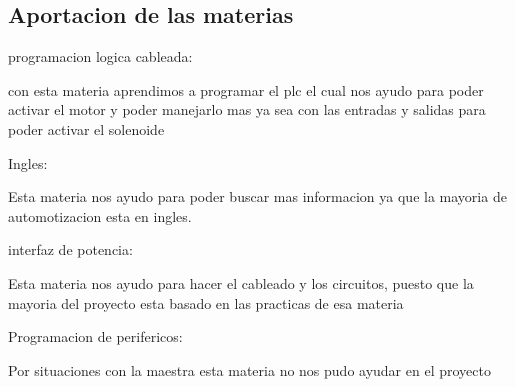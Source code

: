 \documentclass[12pt,a4paper]{article}
\begin{document}
\subsection{Aportacion de las materias}
\begin{flushleft}
programacion logica cableada:
\end{flushleft}
\begin{center}
con esta materia aprendimos a programar el plc el cual nos ayudo  para poder activar el motor y poder manejarlo mas ya sea con las entradas y salidas para poder activar el solenoide 
\end{center}
\begin{flushleft}
Ingles:
\end{flushleft}
\begin{center}
Esta materia nos ayudo para poder buscar mas informacion ya que la mayoria de automotizacion esta en ingles.
\end{center}
\begin{flushleft}
interfaz de potencia:
\end{flushleft}
\begin{center}
Esta materia nos ayudo para hacer el cableado y los circuitos, puesto que la mayoria del proyecto esta basado en las practicas de esa materia 
\end{center}
\begin{flushleft}
Programacion de perifericos:
\end{flushleft}
\begin{center}
Por situaciones con la maestra esta materia no nos pudo ayudar en el proyecto
\end{center}
\end{document}
